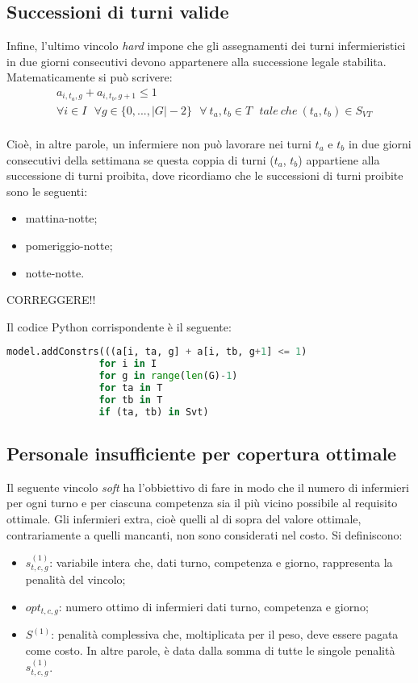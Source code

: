 \subsection{Successioni di turni valide}
Infine, l'ultimo vincolo \textit{hard} impone che gli assegnamenti dei turni infermieristici in due giorni consecutivi devono appartenere alla successione legale stabilita.
Matematicamente si può scrivere:
\begin{equation}
\begin{split}
&a_{i, t_{a}, g} + a_{i, t_{b}, g+1} \leq 1 \\
&\forall i \in I ~~~ \forall g \in \{0,...,|G| - 2\} ~~~ \forall ~ t_{a}, t_{b} \in T ~~~ tale ~ che ~ (t_{a}, t_{b}) \in S_{VT} \\
\end{split}
\end{equation}

Cioè, in altre parole, un infermiere non può lavorare nei turni $t_{a}$ e $t_{b}$ in due giorni consecutivi della settimana se questa coppia di turni ($t_{a}$, $t_{b}$) appartiene alla successione di turni proibita, dove ricordiamo che le successioni di turni proibite sono le seguenti:
\begin{itemize}
\item mattina-notte;
\item pomeriggio-notte;
\item notte-notte.
\end{itemize}
CORREGGERE!!

Il codice Python corrispondente è il seguente:
\begin{lstlisting}[language=Python]
model.addConstrs(((a[i, ta, g] + a[i, tb, g+1] <= 1)
                for i in I
                for g in range(len(G)-1) 
                for ta in T
                for tb in T
                if (ta, tb) in Svt)
\end{lstlisting}

\subsection{Personale insufficiente per copertura ottimale}
Il seguente vincolo \textit{soft} ha l'obbiettivo di fare in modo che il numero di infermieri per ogni turno e per ciascuna competenza sia il più vicino possibile al requisito ottimale. 
Gli infermieri extra, cioè quelli al di sopra del valore ottimale, contrariamente a quelli mancanti, non sono considerati nel costo.
Si definiscono:
\begin{itemize}
\item $s^{(1)}_{t, c, g}$: variabile intera che, dati turno, competenza e giorno, rappresenta la penalità del vincolo;
\item $opt_{t,c,g}$: numero ottimo di infermieri dati turno, competenza e giorno;
\item $S^{(1)}$: penalità complessiva che, moltiplicata per il peso, deve essere pagata come costo. In altre parole, è data dalla somma di tutte le singole penalità $s^{(1)}_{t, c, g}$.
\end{itemize}

